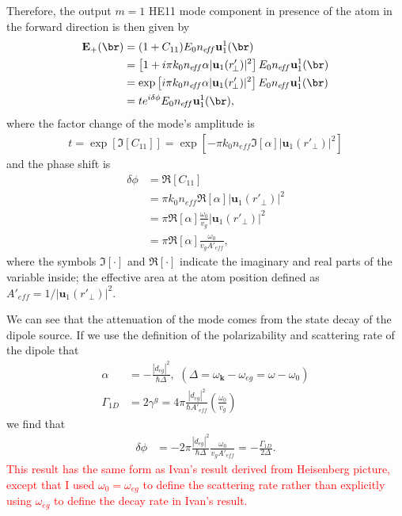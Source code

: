 \documentclass[]{report}
\begin{document}
Therefore, the output $ m=1 $ HE11 mode component in presence of the atom in the forward direction is then given by
\begin{align}
\mathbf{E}_+(\br) &= (1+C_{11})E_0n_{e\!f\!f}\mathbf{u}_{1}^{1} (\br)\\
&=\left[1 +i\pi k_0 n_{e\!f\!f}\alpha  | \mathbf{u}_1(r'_{\!\perp})|^2 \right] E_0n_{e\!f\!f}\mathbf{u}_{1}^{1} (\br)\\
&= \exp\left[i\pi k_0 n_{e\!f\!f}\alpha  | \mathbf{u}_1(r'_{\!\perp})|^2 \right] E_0n_{e\!f\!f}\mathbf{u}_{1}^{1} (\br)\\
&= te^{i\delta\phi}E_0n_{e\!f\!f}\mathbf{u}_{1}^{1} (\br), 
\end{align}
where the factor change of the mode's amplitude is 
\begin{align}
t=\exp\left[\Im[C_{11}]\right]=\exp\left[ -\pi k_0 n_{e\!f\!f}\Im[\alpha]  | \mathbf{u}_1(r'_{\!\perp})|^2 \right]
\end{align}
and the phase shift is
\begin{align}
\delta\phi &= \Re[C_{11}]\\
&=\pi k_0 n_{e\!f\!f}\Re[\alpha]  | \mathbf{u}_1(r'_{\!\perp})|^2\\
&= \pi \Re[\alpha] \frac{\omega_0}{v_g}  | \mathbf{u}_1(r'_{\!\perp})|^2\\
&= \pi \Re[\alpha] \frac{\omega_0}{v_gA'_{e\!f\!f}},
\end{align}
where the symbols $ \Im[\cdot] $ and $ \Re[\cdot] $ indicate the imaginary and real parts of the variable inside; the effective area at the atom position defined as $ A'_{e\!f\!f}=1/| \mathbf{u}_1(r'_{\!\perp})|^2 $. 

We can see that the attenuation of the mode comes from the state decay of the dipole source. If we use the definition of the polarizability and scattering rate of the dipole that 
\begin{align}
\alpha &=-\frac{|d_{eg}|^2}{\hbar \Delta}, \,\, (\Delta=\omega_{\mathbf{k}}-\omega_{eg}=\omega-\omega_0)\\
\Gamma_{1D} &= 2\gamma^g=4\pi \frac{|d_{eg}|^2}{\hbar A'_{e\!f\!f}}\left(\frac{\omega_0}{v_g} \right)
\end{align}
we find that 
\begin{align}
\delta\phi &= -2\pi \frac{|d_{eg}|^2}{\hbar \Delta} \frac{\omega_0}{v_gA'_{e\!f\!f}}=-\frac{\Gamma_{1\!D}}{2\Delta}.
\end{align}
\textcolor{red}{This result has the same form as Ivan's result derived from Heisenberg picture, except that I used $ \omega_0=\omega_{eg} $ to define the scattering rate rather than explicitly using $ \omega_{eg} $ to define the decay rate in Ivan's result. }
\end{document}
